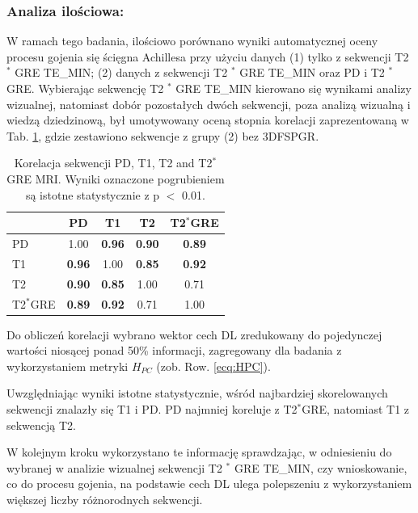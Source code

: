 \subsubsection{Analiza ilościowa:} W ramach tego badania, ilościowo porównano wyniki automatycznej oceny procesu gojenia się ścięgna Achillesa przy użyciu danych (1) tylko z sekwencji T2 $^\ast$ GRE TE\_MIN; (2) danych z sekwencji T2 $^\ast$ GRE TE\_MIN oraz PD i T2 $^\ast$ GRE. Wybierając sekwencję T2 $^\ast$ GRE TE\_MIN kierowano się wynikami analizy wizualnej, natomiast dobór pozostałych dwóch sekwencji, poza analizą wizualną i wiedzą dziedzinową, był umotywowany oceną stopnia korelacji zaprezentowaną w Tab. \ref{tab:inter-protocol-corr}, gdzie zestawiono sekwencje z grupy (2) bez 3DFSPGR.

\begin{table}[h]
	\centering
	\setlength{\tabcolsep}{12pt}
	\caption{Korelacja sekwencji PD, T1, T2 and T2$^\ast$ GRE MRI. Wyniki oznaczone pogrubieniem są istotne statystycznie z p $<$ 0.01.}
	\label{tab:inter-protocol-corr}
	\begin{tabular}{l||c|c|c|c}
		& PD & T1 & T2 & T2$^\ast$GRE \\ \hline \hline
		PD & 1.00 & \textbf{0.96} & \textbf{0.90} & \textbf{0.89} \\ \hline
		T1 & \textbf{0.96} & 1.00 & \textbf{0.85} & \textbf{0.92} \\ \hline
		T2 & \textbf{0.90} & \textbf{0.85} & 1.00 & 0.71 \\ \hline
		T2$^\ast$GRE & \textbf{0.89} & \textbf{0.92} & 0.71 & 1.00  %
	\end{tabular}
\end{table} 

Do obliczeń korelacji wybrano wektor cech DL zredukowany do pojedynczej wartości niosącej ponad 50\% informacji, zagregowany dla badania z wykorzystaniem metryki $H_{PC}$ (zob. Row. \ref{ecq:HPC}). 

Uwzględniając wyniki istotne statystycznie, wśród najbardziej skorelowanych sekwencji znalazły się T1 i PD. PD najmniej koreluje z T2$^\ast$GRE, natomiast T1 z sekwencją T2. 

W kolejnym kroku wykorzystano te informację sprawdzając, w odniesieniu do wybranej w analizie wizualnej sekwencji T2 $^\ast$ GRE TE\_MIN, czy wnioskowanie, co do procesu gojenia, na podstawie cech DL ulega polepszeniu z wykorzystaniem większej liczby różnorodnych sekwencji. 

